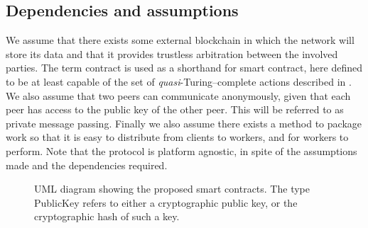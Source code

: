 \subsection{Dependencies and assumptions}
\label{sec:res:dependencies}
We assume that there exists some external blockchain in which the network will store its data and that it provides trustless arbitration between the involved parties. The term contract is used as a shorthand for smart contract, here defined to be at least capable of the set of \textit{quasi}-Turing--complete actions described in . We also assume that two peers can communicate anonymously, given that each peer has access to the public key of the other peer. This will be referred to as private message passing. Finally we also assume there exists a method to package work so that it is easy to distribute from clients to workers, and for workers to perform.
Note that the protocol is platform agnostic, in spite of the assumptions made and the dependencies required.

\begin{figure}[ht]
\centering
{}
\caption{UML diagram showing the proposed smart contracts. The type PublicKey refers to either a cryptographic public key, or the cryptographic hash of such a key.}
\label{fig:res:umal}
\end{figure}


